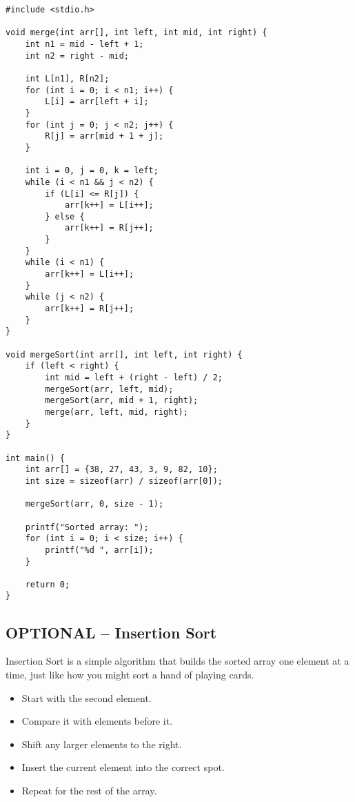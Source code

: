 \documentclass[a4paper,12pt]{article}
\begin{document}
\lstset{language=C}
\newpage

\begin{lstlisting}
#include <stdio.h>

void merge(int arr[], int left, int mid, int right) {
    int n1 = mid - left + 1;
    int n2 = right - mid;

    int L[n1], R[n2];
    for (int i = 0; i < n1; i++) {
        L[i] = arr[left + i];
    }
    for (int j = 0; j < n2; j++) {
        R[j] = arr[mid + 1 + j];
    }

    int i = 0, j = 0, k = left;
    while (i < n1 && j < n2) {
        if (L[i] <= R[j]) {
            arr[k++] = L[i++];
        } else {
            arr[k++] = R[j++];
        }
    }
    while (i < n1) {
        arr[k++] = L[i++];
    }
    while (j < n2) {
        arr[k++] = R[j++];
    }
}

void mergeSort(int arr[], int left, int right) {
    if (left < right) {
        int mid = left + (right - left) / 2;
        mergeSort(arr, left, mid);
        mergeSort(arr, mid + 1, right);
        merge(arr, left, mid, right);
    }
}

int main() {
    int arr[] = {38, 27, 43, 3, 9, 82, 10};
    int size = sizeof(arr) / sizeof(arr[0]);

    mergeSort(arr, 0, size - 1);

    printf("Sorted array: ");
    for (int i = 0; i < size; i++) {
        printf("%d ", arr[i]);
    }

    return 0;
}
\end{lstlisting}
\vfill

\subsection{OPTIONAL -- Insertion Sort}

Insertion Sort is a simple algorithm that builds the sorted array one element at a time, just like how you might sort a hand of playing cards.

\begin{itemize}
    \item Start with the second element.
    \item Compare it with elements before it.
    \item Shift any larger elements to the right.
    \item Insert the current element into the correct spot.
    \item Repeat for the rest of the array.
\end{itemize}
\end{document}
